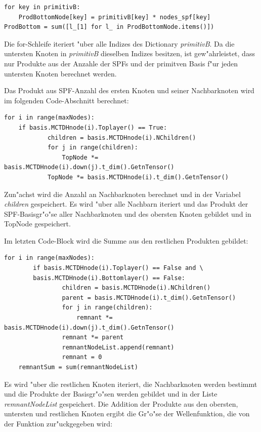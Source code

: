 \begin{verbatim}
for key in primitivB:
    ProdBottomNode[key] = primitivB[key] * nodes_spf[key]
ProdBottom = sum([l_[1] for l_ in ProdBottomNode.items()])
\end{verbatim}

Die for-Schleife iteriert "uber alle Indizes des Dictionary \textit{primitivB}.
Da die untersten Knoten in \textit{primitivB} dieselben Indizes besitzen, ist
gew"ahrleistet, dass nur Produkte aus der Anzahle der SPFs und der primitven Basis 
f"ur jeden untersten Knoten berechnet werden.

Das Produkt aus SPF-Anzahl des ersten Knoten und seiner Nachbarknoten wird im folgenden
Code-Abschnitt berechnet:

\begin{verbatim}
for i in range(maxNodes):
    if basis.MCTDHnode(i).Toplayer() == True:
            children = basis.MCTDHnode(i).NChildren()
            for j in range(children):
                TopNode *= basis.MCTDHnode(i).down(j).t_dim().GetnTensor()
            TopNode *= basis.MCTDHnode(i).t_dim().GetnTensor()
\end{verbatim}

Zun"achst wird die Anzahl an Nachbarknoten berechnet und in der Variabel \textit{children} gespeichert.
Es wird "uber alle Nachbarn iteriert und das Produkt der SPF-Basisgr"o"se aller Nachbarknoten
 und des obersten Knoten gebildet und in TopNode gespeichert.

Im letzten Code-Block wird die Summe aus den restlichen Produkten gebildet:

\begin{verbatim}
for i in range(maxNodes):
        if basis.MCTDHnode(i).Toplayer() == False and \
        basis.MCTDHnode(i).Bottomlayer() == False:
                children = basis.MCTDHnode(i).NChildren()
                parent = basis.MCTDHnode(i).t_dim().GetnTensor()
                for j in range(children):
                    remnant *= basis.MCTDHnode(i).down(j).t_dim().GetnTensor() 
                remnant *= parent
                remnantNodeList.append(remnant)
                remnant = 0
    remnantSum = sum(remnantNodeList)
\end{verbatim}

Es wird "uber die restlichen Knoten iteriert, die Nachbarknoten werden bestimmt und die Produkte
der Basisgr"o"sen werden gebildet und in der Liste \textit{remnantNodeList} gespeichert.
Die Addition der Produkte aus den obersten, untersten und restlichen Knoten ergibt die
Gr"o"se der Wellenfunktion, die von der Funktion zur"uckgegeben wird: 

